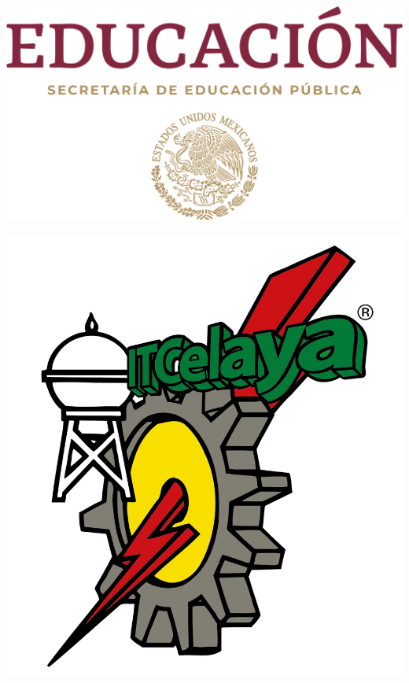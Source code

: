 \begin{titlepage}
    \begin{center}
        \begin{minipage}{0.25\textwidth} %
            \begin{flushleft}
                \includegraphics[scale=0.08]{img/logo-sep-vertical.png} %
            \end{flushleft}
        \end{minipage}
        \hfill
        \begin{minipage}{0.4\textwidth} %
            \begin{center}
                \MakeUppercase{\nombreUniversidad}
            \end{center}
        \end{minipage}
        \hfill
        \begin{minipage}{0.25\textwidth} %
            \begin{flushright}
                \includegraphics[scale=0.045]{img/logo-itc.png} %

\end{flushright}
\end{minipage}
\end{center}
\end{titlepage}
